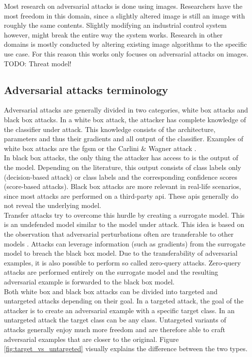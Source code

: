 Most research on adversarial attacks is done using images. Researchers have the most freedom in this domain, since a slightly altered image is still an image with roughly the same contents. Slightly modifying an industrial control system however, might break the entire way the system works. Research in other domains is mostly conducted by altering existing image algorithms to the specific use case. For this reason this works only focuses on adversarial attacks on images.\\ 

TODO: Threat model!

\subsection{Adversarial attacks terminology}
Adversarial attacks are generally divided in two categories, white box attacks and black box attacks. In a white box attack, the attacker has complete knowledge of the classifier under attack. This knowledge consists of the architecture, parameters and thus their gradients and all output of the classifier. Examples of white box attacks are the \gls{fgsm} \cite{FGSM} or the Carlini \& Wagner attack \cite{cw_attack}.\\

In black box attacks, the only thing the attacker has access to is the output of the model. Depending on the literature, this output consists of class labels only (decision-based attack) or class labels and the corresponding confidence scores (score-based attacks). Black box attacks are more relevant in real-life scenarios, since most attacks are performed on a third-party \gls{api}. These \glspl{api} generally do not reveal the underlying model.\\

Transfer attacks \cite{transfer_attack} try to overcome this hurdle by creating a surrogate model. This is an undefended model similar to the model under attack. This idea is based on the observation that adversarial perturbations often are transferable to other models \cite{FGSM}. Attacks can leverage information (such as gradients) from the surrogate model to breach the black box model. Due to the transferability of adversarial examples, it is also possible to perform so called zero-query attacks. Zero-query attacks are performed entirely on the surrogate model and the resulting adversarial example is forwarded to the black box model.\\

Both white box and black box attacks can be divided into targeted and untargeted attacks depending on their goal. In a targeted attack, the goal of the attacker is to create an adversarial example with a specific target class. In an untargeted attack the target class can be any class. Untargeted variants of attacks generally enjoy much more freedom and are therefore able to craft adversarial examples that are closer to the original. Figure \ref{fig:target_vs_untargeted} visually explains the difference between the two types.

